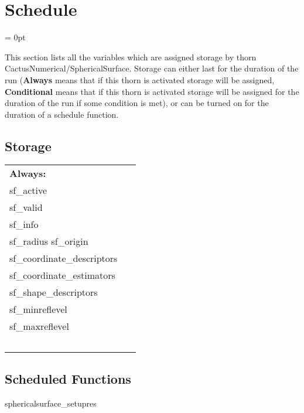 
\section{Schedule} 


\parskip = 0pt


\noindent This section lists all the variables which are assigned storage by thorn CactusNumerical/SphericalSurface.  Storage can either last for the duration of the run ({\bf Always} means that if this thorn is activated storage will be assigned, {\bf Conditional} means that if this thorn is activated storage will be assigned for the duration of the run if some condition is met), or can be turned on for the duration of a schedule function.


\subsection*{Storage}

\hspace{5mm}

 \begin{tabular*}{160mm}{ll} 

{\bf Always:}&  ~ \\ 
 sf\_active & ~\\ 
 sf\_valid & ~\\ 
 sf\_info & ~\\ 
 sf\_radius sf\_origin & ~\\ 
 sf\_coordinate\_descriptors & ~\\ 
 sf\_coordinate\_estimators & ~\\ 
 sf\_shape\_descriptors & ~\\ 
 sf\_minreflevel & ~\\ 
 sf\_maxreflevel & ~\\ 
~ & ~\\ 
\end{tabular*} 


\subsection*{Scheduled Functions}
\vspace{5mm}


\hspace{5mm} sphericalsurface\_setupres 

\hspace{5mm}{\it set surface resolution automatically } 


